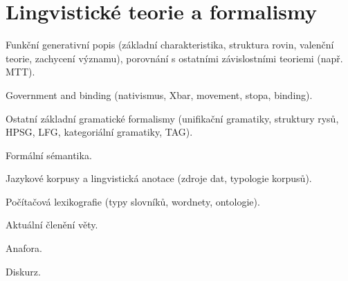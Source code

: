 \newpage
\section{Lingvistické teorie a formalismy}
\begin{pozadavky}
\begin{pitemize}
\item Funkční generativní popis (základní charakteristika, struktura rovin, valenční teorie, zachycení významu), porovnání s ostatními závislostními teoriemi (např. MTT).
\item Government and binding (nativismus, Xbar, movement, stopa, binding).
\item Ostatní základní gramatické formalismy (unifikační gramatiky, struktury rysů, HPSG, LFG, kategoriální gramatiky, TAG).
\item Formální sémantika.
\item Jazykové korpusy a lingvistická anotace (zdroje dat, typologie korpusů).
\item Počítačová lexikografie (typy slovníků, wordnety, ontologie).
\item Aktuální členění věty.
\item Anafora.
\item Diskurz.
\end{pitemize}
\end{pozadavky}